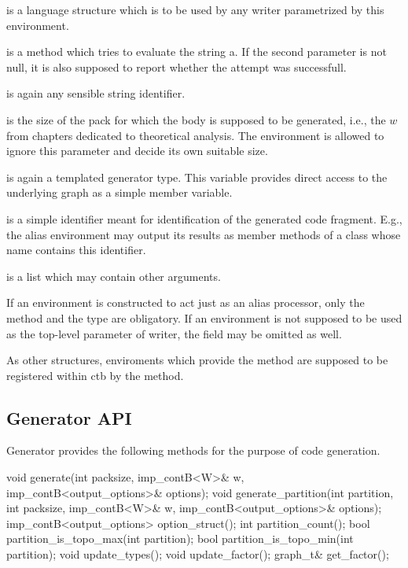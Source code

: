 \begin{description}
\item {} is a language structure which is to be used by any writer parametrized by this environment.
\item {} is a method which tries to evaluate the string a. If the second parameter is not null, it is also supposed to report whether the attempt was successfull.
\item {} is again any sensible string identifier.
\item {}
  \begin{description}
    \item {} is the size of the pack for which the body is supposed to be generated, i.e., the $w$ from chapters dedicated to theoretical analysis. The environment is allowed to ignore this parameter and decide its own suitable size.
    \item {} is again a templated generator type. This variable provides direct access to the underlying graph as a simple member variable.
    \item {} is a simple identifier meant for identification of the generated code fragment. E.g., the alias environment may output its results as member methods of a class whose name contains this identifier.
    \item {} is a list which may contain other arguments.
  \end{description}
\end{description}

If an environment is constructed to act just as an alias processor, only the  method and the  type are obligatory. If an environment is not supposed to be used as the top-level parameter of writer, the  field may be omitted as well.

As other structures, enviroments which provide the  method are supposed to be registered within ctb by the  method.

\subsection{Generator API}

Generator provides the following methods for the purpose of code generation. 

\begin{code}
void generate(int packsize, 
    imp_contB<W>& w, imp_contB<output_options>& options); 
void generate_partition(int partition, int packsize, 
    imp_contB<W>& w, imp_contB<output_options>& options);
imp_contB<output_options> option_struct();
int partition_count();
bool partition_is_topo_max(int partition);
bool partition_is_topo_min(int partition);
void update_types();
void update_factor();
graph_t& get_factor();
\end{code}

